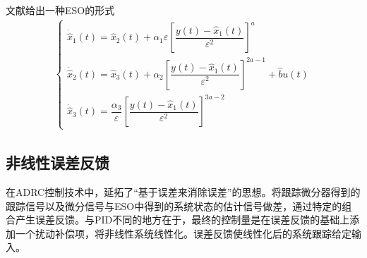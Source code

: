 文献\parencite{Guo_2011}给出一种ESO的形式
\begin{align}\left\{\begin{array}{l}
\dot{\hat{x}}_{1}(t)=\hat{x}_{2}(t)+\alpha_{1} \varepsilon\left[\dfrac{y(t)-\hat{x}_{1}(t)}{\varepsilon^{2}}\right]^{a} \\[5mm]
\dot{\hat{x}}_{2}(t)=\hat{x}_{3}(t)+\alpha_{2} \left[\dfrac{y(t)-\hat{x}_{1}(t)}{\varepsilon^{2}}\right]^{2 a-1}+\hat{b}u(t) \\[5mm]
\dot{\hat{x}}_{3}(t)=\dfrac{\alpha_{3}}{\varepsilon}\left[\dfrac{y(t)-\hat{x}_{1}(t)}{\varepsilon^{2}}\right]^{3 a-2}
\end{array}\right.		\label{eq_sec_ESO}
\end{align}
\subsection{非线性误差反馈}
在ADRC控制技术中，延拓了“基于误差来消除误差”的思想。将跟踪微分器得到的跟踪信号以及微分信号与ESO中得到的系统状态的估计信号做差，通过特定的组合产生误差反馈。与PID不同的地方在于，最终的控制量是在误差反馈的基础上添加一个扰动补偿项，将非线性系统线性化。误差反馈使线性化后的系统跟踪给定输入。


